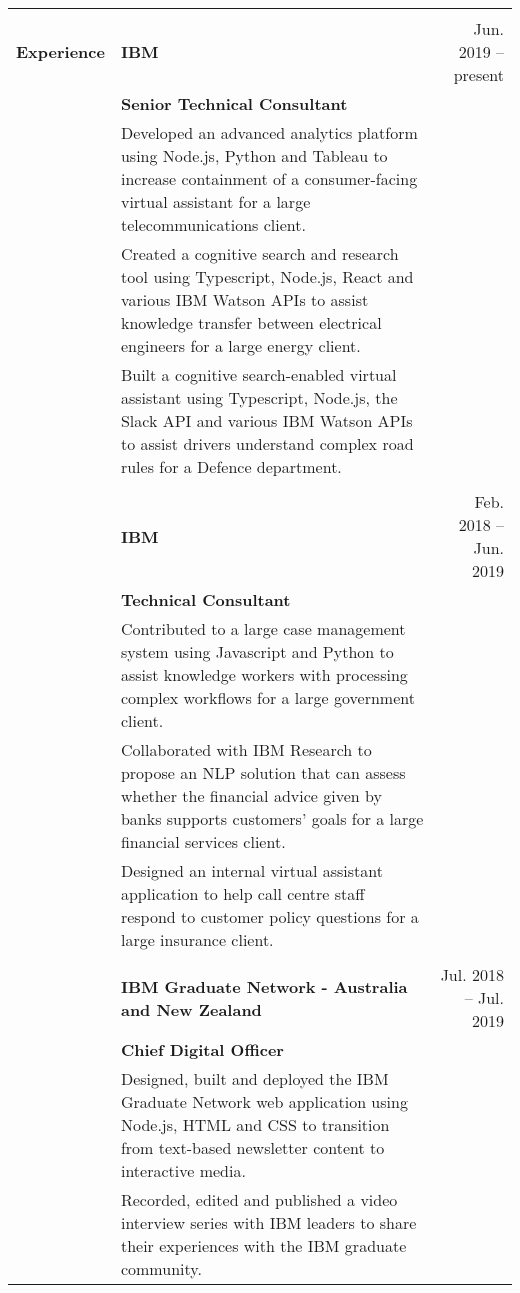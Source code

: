 \documentclass[a4paper,10pt]{letter}
\begin{document}
\begin{longtable}{ @{} p{2.5cm} p{12cm} r }
\hline \\
\large
\textbf{Experience} & \textbf{IBM} & \normalsize Jun. 2019 -- present \\
 & \textbf{Senior Technical Consultant} & \\
\large
 & Developed an advanced analytics platform using Node.js, Python and Tableau to increase containment of a consumer-facing virtual assistant for a large telecommunications client. & \\
 & Created a cognitive search and research tool using Typescript, Node.js, React and various IBM Watson APIs to assist knowledge transfer between electrical engineers for a large energy client. & \\
 & Built a cognitive search-enabled virtual assistant using Typescript, Node.js, the Slack API and various IBM Watson APIs to assist drivers understand complex road rules for a Defence department. & \\
 & & \\
\large
 & \textbf{IBM} & \normalsize Feb. 2018 -- Jun. 2019 \\
 & \textbf{Technical Consultant} & \\
\large
 & Contributed to a large case management system using Javascript and Python to assist knowledge workers with processing complex workflows for a large government client. & \\
 & Collaborated with IBM Research to propose an NLP solution that can assess whether the financial advice given by banks supports customers' goals for a large financial services client. & \\
 & Designed an internal virtual assistant application to help call centre staff respond to customer policy questions for a large insurance client. & \\
 & & \\
\large
 & \textbf{IBM Graduate Network - Australia and New Zealand} & \normalsize Jul. 2018 -- Jul. 2019 \\
 & \textbf{Chief Digital Officer} & \\
\large
 & Designed, built and deployed the IBM Graduate Network web application using Node.js, HTML and CSS to transition from text-based newsletter content to interactive media. & \\
 & Recorded, edited and published a video interview series with IBM leaders to share their experiences with the IBM graduate community. & \\

\end{longtable}
\end{document}
